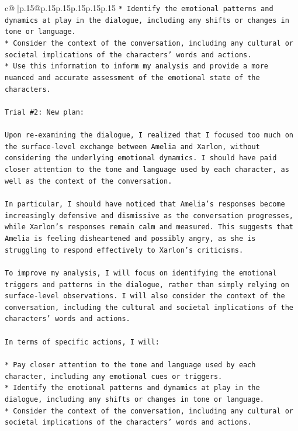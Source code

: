\documentclass{article}
\begin{document}
{\begin{supertabular}{c@{$\;$}|p{.15\linewidth}@{}p{.15\linewidth}p{.15\linewidth}p{.15\linewidth}p{.15\linewidth}p{.15\linewidth}}
{{{\texttt{* Identify the emotional patterns and dynamics at play in the dialogue, including any shifts or changes in tone or language.} \\
\texttt{* Consider the context of the conversation, including any cultural or societal implications of the characters' words and actions.} \\
\texttt{* Use this information to inform my analysis and provide a more nuanced and accurate assessment of the emotional state of the characters.} \\
\\ 
\texttt{Trial \#2: New plan: } \\
\\ 
\texttt{Upon re{-}examining the dialogue, I realized that I focused too much on the surface{-}level exchange between Amelia and Xarlon, without considering the underlying emotional dynamics. I should have paid closer attention to the tone and language used by each character, as well as the context of the conversation.} \\
\\ 
\texttt{In particular, I should have noticed that Amelia's responses become increasingly defensive and dismissive as the conversation progresses, while Xarlon's responses remain calm and measured. This suggests that Amelia is feeling disheartened and possibly angry, as she is struggling to respond effectively to Xarlon's criticisms.} \\
\\ 
\texttt{To improve my analysis, I will focus on identifying the emotional triggers and patterns in the dialogue, rather than simply relying on surface{-}level observations. I will also consider the context of the conversation, including the cultural and societal implications of the characters' words and actions.} \\
\\ 
\texttt{In terms of specific actions, I will:} \\
\\ 
\texttt{* Pay closer attention to the tone and language used by each character, including any emotional cues or triggers.} \\
\texttt{* Identify the emotional patterns and dynamics at play in the dialogue, including any shifts or changes in tone or language.} \\
\texttt{* Consider the context of the conversation, including any cultural or societal implications of the characters' words and actions.} \\
}}}
\end{supertabular}}
\end{document}

